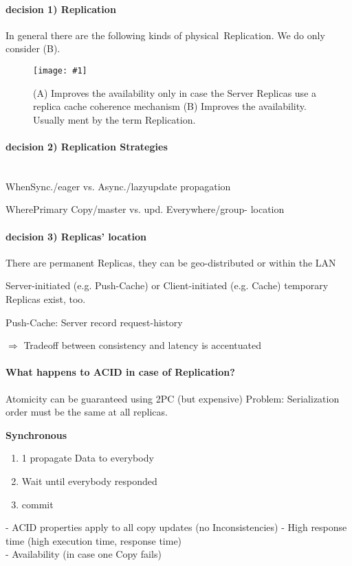 \documentclass[a4paper,12pt]{article}%
\newcommand{\grafik}[2]{\begin{figure}[!htb]
		\noindent\texttt{[image: \#1]}
		\caption{\textrm{#2}}%
	\end{figure}}
\newif\ifcomment
\begin{document}
\paragraph{decision 1) Replication}
In general there are the following kinds of \glqq physical\grqq ~Replication. We do only consider (B).
\grafik{src/Grafik01}{(A) Improves the availability only in case the Server Replicas use a replica cache coherence mechanism
	(B) Improves the availability. Usually ment by the term \glqq Replication\grqq.}
\paragraph{decision 2) Replication Strategies}~\\
When\qquad Sync./eager vs. Async./lazy\qquad \qquad\qquad\qquad update propagation

Where\qquad Primary Copy/master vs. upd. Everywhere/group\qquad - location

\paragraph{decision 3) Replicas' location}
There are permanent Replicas, they can be geo-distributed or within the LAN

Server-initiated (e.g. Push-Cache) or Client-initiated (e.g. Cache) temporary Replicas exist, too.

Push-Cache: Server record request-history

$\Rightarrow$ Tradeoff between consistency and latency is accentuated

\paragraph{What happens to ACID in case of Replication?}
Atomicity can be guaranteed using 2PC (but expensive)
Problem: Serialization order must be the same at all replicas.



\ifcomment
{\bf Synchronous} 


\begin{enumerate}
 \item 1 propagate Data  to everybody
 \item Wait until everybody responded 
 \item commit        
\end{enumerate}

 {\color[HTML]{9AB299} 
- ACID properties apply to all copy updates (no Inconsistencies)}    
{\color[HTML]{A38C8C} -  High response time (high execution time, response time)\\
- Availability (in case one Copy fails)}
\end{document}
